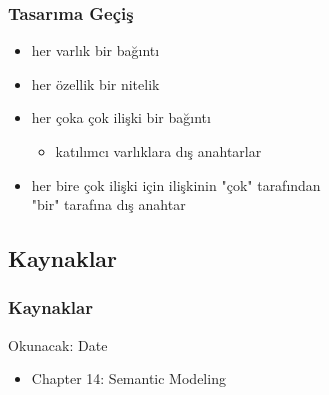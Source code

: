 \documentclass[dvipsnames]{beamer}
\theoremstyle{definition}
\theoremstyle{example}
\theoremstyle{plain}
\begin{document}
\begin{frame}
  \frametitle{Tasarıma Geçiş}

  \begin{itemize}
    \item her varlık bir bağıntı

    \pause
    \item her özellik bir nitelik

    \pause
    \item her çoka çok ilişki bir bağıntı
    \begin{itemize}
      \item katılımcı varlıklara dış anahtarlar
    \end{itemize}

    \pause
    \item her bire çok ilişki için ilişkinin "çok" tarafından\\
      "bir" tarafına dış anahtar
 \end{itemize}
\end{frame}

\subsection*{Kaynaklar}

\begin{frame}
  \frametitle{Kaynaklar}

  \begin{block}{Okunacak: Date}
    \begin{itemize}
      \item Chapter 14: \alert{Semantic Modeling}
    \end{itemize}
  \end{block}
\end{frame}
\end{document}

